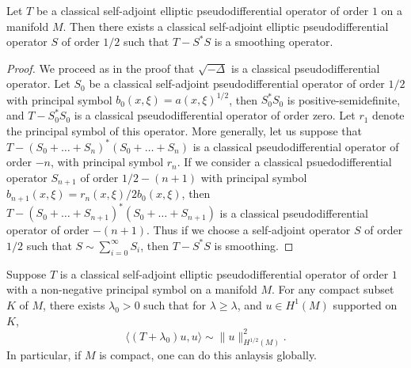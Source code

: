 \begin{lemma}
    Let $T$ be a classical self-adjoint elliptic pseudodifferential operator of order $1$ on a manifold $M$. Then there exists a classical self-adjoint elliptic pseudodifferential operator $S$ of order $1/2$ such that $T - S^* S$ is a smoothing operator.
\end{lemma}
\begin{proof}
    We proceed as in the proof that $\sqrt{-\Delta}$ is a classical pseudodifferential operator. Let $S_0$ be a classical self-adjoint pseudodifferential operator of order $1/2$ with principal symbol $b_0(x,\xi) = a(x,\xi)^{1/2}$, then $S_0^* S_0$ is positive-semidefinite, and $T - S_0^* S_0$ is a classical pseudodifferential operator of order zero. Let $r_1$ denote the principal symbol of this operator. More generally, let us suppose that $T - (S_0 + \dots + S_n)^* (S_0 + \dots + S_n)$ is a classical pseudodifferential operator of order $-n$, with principal symbol $r_n$. If we consider a classical psuedodifferential operator $S_{n+1}$ of order $1/2 - (n+1)$ with principal symbol $b_{n+1}(x,\xi) = r_n(x,\xi) / 2 b_0(x,\xi)$, then $T - (S_0 + \dots + S_{n+1})^* (S_0 + \dots + S_{n+1})$ is a classical pseudodifferential operator of order $-(n+1)$. Thus if we choose a self-adjoint operator $S$ of order $1/2$ such that $S \sim \sum_{i = 0}^\infty S_i$, then $T - S^* S$ is smoothing. 
\end{proof}

\begin{lemma}
    Suppose $T$ is a classical self-adjoint elliptic pseudodifferential operator of order $1$ with a non-negative principal symbol on a manifold $M$. For any compact subset $K$ of $M$, there exists $\lambda_0 > 0$ such that for $\lambda \geq \lambda$, and $u \in H^1(M)$ supported on $K$,
    \[ \langle (T + \lambda_0) u, u \rangle \sim \| u \|_{H^{1/2}(M)}^2. \]
    In particular, if $M$ is compact, one can do this anlaysis globally.
\end{lemma}

